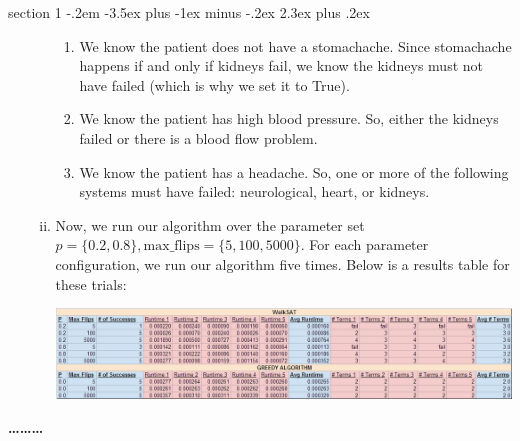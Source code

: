 \documentclass[12pt]{article}
\makeatletter
\newenvironment{problem}{\@startsection
       {section}
       {1}
       {-.2em}
       {-3.5ex plus -1ex minus -.2ex}
       {2.3ex plus .2ex}
       {\pagebreak[3] %
       \large\bf\noindent{Problem }
       }
       }
       {%
       \begin{center}\large\bf \ldots\ldots\ldots\end{center}}
\makeatother
\begin{document}
\begin{problem}{}
\begin{enumerate}[a.]
\begin{enumerate}[i.]
\begin{enumerate}
\item We know the patient does not have a stomachache. Since stomachache happens if and only if kidneys fail, we know the kidneys must not have failed (which is why we set it to True).

\item We know the patient has high blood pressure. So, either the kidneys failed or there is a blood flow problem.

\item We know the patient has a headache. So, one or more of the following systems must have failed: neurological, heart, or kidneys.
\end{enumerate}

\item Now, we run our algorithm over the parameter set $p = \{0.2, 0.8\}, \textrm{max\_flips} = \{5, 100, 5000\}$. For each parameter configuration, we run our algorithm five times. Below is a results table for these trials:
\begin{center}
\includegraphics[width=\textwidth]{results.png}
\end{center}


\end{enumerate}
\end{enumerate}
\end{problem}
\end{document}
